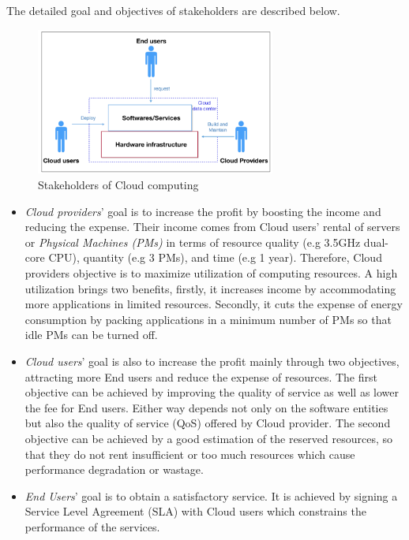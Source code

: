 The detailed goal and objectives of stakeholders are described below. 
\begin{figure}
	\centering
	\includegraphics[width=0.7\textwidth]{pics/stakeholders.png}
	\caption{Stakeholders of Cloud computing}
	\label{fig:stakeholders}
\end{figure}

\begin{itemize}
	\item \emph{Cloud providers}' goal is to increase the profit by boosting the income and reducing the expense. Their income comes from Cloud users' rental of servers or \emph{Physical Machines (PMs)} in terms of resource quality (e.g  3.5GHz dual-core CPU), quantity (e.g 3 PMs), and time (e.g 1 year). Therefore, Cloud providers objective is to maximize utilization of computing resources. A high utilization brings two benefits, firstly, it increases income by accommodating more applications in limited resources. Secondly, it cuts the expense of energy consumption by packing applications in a minimum number of PMs so that idle PMs can be turned off. 	
	\item \emph{Cloud users}' goal is also to increase the profit mainly through two objectives, attracting more End users and reduce the expense of resources. The first objective can be achieved by improving the quality of service as well as lower the fee for End users. Either way depends not only on the software entities but also the quality of service (QoS) offered by Cloud provider. The second objective can be achieved by a good estimation of the reserved resources, so that they do not rent insufficient  or too much resources which cause performance degradation or wastage.
	\item \emph{End Users}' goal is to obtain a satisfactory service. It is achieved by signing a Service Level Agreement (SLA) with Cloud users which constrains the performance of the services.
\end{itemize}

